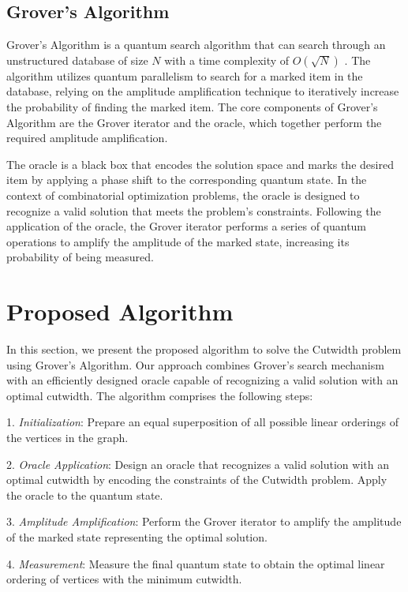 \subsection{Grover's Algorithm}

Grover's Algorithm is a quantum search algorithm that can search through an unstructured database of size $N$ with a time complexity of $O(\sqrt{N})$ \cite{grover_original}. The algorithm utilizes quantum parallelism to search for a marked item in the database, relying on the amplitude amplification technique to iteratively increase the probability of finding the marked item. The core components of Grover's Algorithm are the Grover iterator and the oracle, which together perform the required amplitude amplification.

The oracle is a black box that encodes the solution space and marks the desired item by applying a phase shift to the corresponding quantum state. In the context of combinatorial optimization problems, the oracle is designed to recognize a valid solution that meets the problem's constraints. Following the application of the oracle, the Grover iterator performs a series of quantum operations to amplify the amplitude of the marked state, increasing its probability of being measured.

\section{Proposed Algorithm}
\label{sec:algorithm}

In this section, we present the proposed algorithm to solve the Cutwidth problem using Grover's Algorithm. Our approach combines Grover's search mechanism with an efficiently designed oracle capable of recognizing a valid solution with an optimal cutwidth. The algorithm comprises the following steps:

1. \textit{Initialization}: Prepare an equal superposition of all possible linear orderings of the vertices in the graph.

2. \textit{Oracle Application}: Design an oracle that recognizes a valid solution with an optimal cutwidth by encoding the constraints of the Cutwidth problem. Apply the oracle to the quantum state.

3. \textit{Amplitude Amplification}: Perform the Grover iterator to amplify the amplitude of the marked state representing the optimal solution.

4. \textit{Measurement}: Measure the final quantum state to obtain the optimal linear ordering of vertices with the minimum cutwidth.

